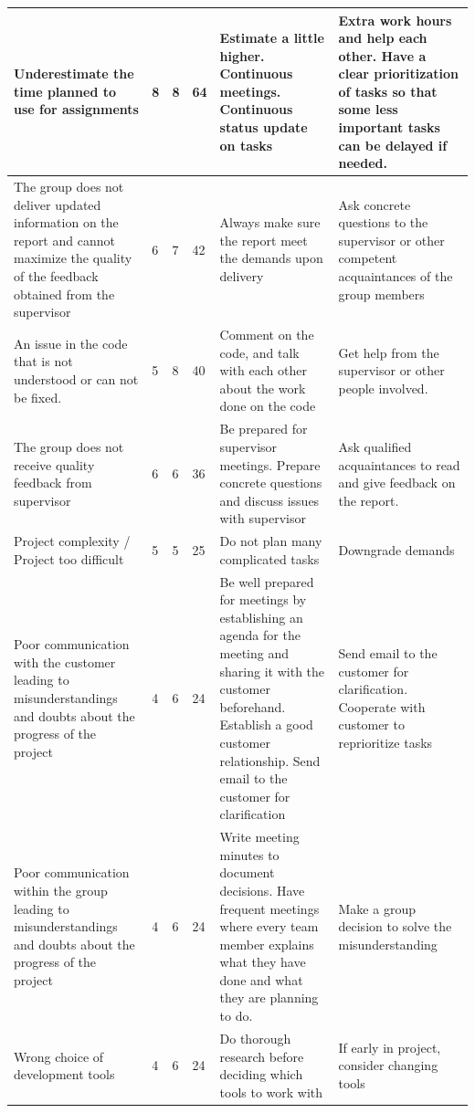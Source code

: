 \begin{appendices}
\begin{longtable}{ | p{4.5cm} | p{1cm} | p{1cm} | p{1cm} | p{4.5cm} | p{4.5cm} |}
	
	Underestimate the time planned to use for assignments & 8 & 8 & 64 & Estimate a little higher. Continuous meetings. Continuous status update on tasks & Extra work hours and help each other. Have a clear prioritization of tasks so that some less important tasks can be delayed if needed. \\ \hline
	
	The group does not deliver updated information on the report and cannot maximize the quality of the feedback obtained from the supervisor & 6 & 7 & 42 & Always make sure the report meet the demands upon delivery & Ask concrete questions to the supervisor or other competent acquaintances of the group members \\ \hline
	
	An issue in the code that is not understood or can not be fixed. & 5 & 8 & 40 & Comment on the code, and talk with each other about the work done on the code & Get help from the supervisor or other people involved. \\ \hline
	
	The group does not receive quality feedback from supervisor & 6 & 6 & 36 & Be prepared for supervisor meetings. Prepare concrete questions and discuss issues with supervisor & Ask qualified acquaintances to read and give feedback on the report.  \\ \hline
	
	Project complexity / Project too difficult & 5 & 5 & 25 & Do not plan many complicated tasks & Downgrade demands \\ \hline
	
	Poor communication with the customer leading to misunderstandings and doubts about the progress of the project & 4 & 6 & 24 & Be well prepared for meetings by establishing an agenda for the meeting and sharing it with the customer beforehand. Establish a good customer relationship. Send email to the customer for clarification & Send email to the customer for clarification. Cooperate with customer to reprioritize tasks \\ \hline
	
	Poor communication within the group leading to misunderstandings and doubts about the progress of the project & 4 & 6 & 24 & Write meeting minutes to document decisions. Have frequent meetings where every team member explains what they have done and what they are planning to do. & Make a group decision to solve the misunderstanding \\ \hline
	
	Wrong choice of development tools & 4 & 6 & 24 & Do thorough research before deciding which tools to work with & If early in project, consider changing tools \\ \hline
	

\end{longtable}
\end{appendices}
